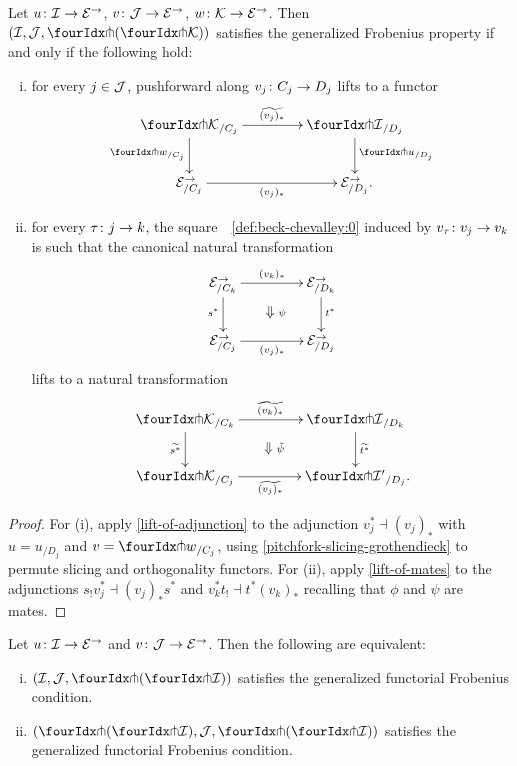 \documentclass[reqno,10pt,a4paper,oneside,draft]{amsart}
\begin{document}
{{\begin{proposition} \label{lift-pushforward}
Let $u \co \cal{I} \to \catE^\to$, $v \co \cal{J} \to \cal{E}^\to$, $w \co \cal{K} \to \catE^\to$.
Then $(\cal{I}, \cal{J}, \liftl{(\liftr{\cal{K}})})$ satisfies the generalized Frobenius property if and only if the following hold:
\begin{enumerate}[(i)]
\item for every $j \in \cal{J}$, pushforward along $v_j \co C_j \to D_j$ lifts to a functor
\[
\xymatrix@C=1.5cm{
  {\liftr{\cal{K}}}_{/C_j}
  \ar[r]^{\widetilde{(v_j)_*}}
  \ar[d]_{\liftr{w}_{/C_j}}
&
  {\liftr{\cal{I}}}_{/D_j}
  \ar[d]^{{\liftr{u}}_{/D_j}}
\\
  \catE_{/C_j}^\to
  \ar[r]_{(v_j)_*}
&
  \catE_{/D_j}^\to
\rlap{.}}
\]
\item for every $\tau \co j \to k$, the square~~\eqref{def:beck-chevalley:0} induced by $v_\tau \co v_j \to v_k$ is such that the canonical natural transformation
\[
\xymatrix@C+2em{
  \catE^\to_{/C_k}
  \ar[r]^{(v_k)_*}
  \ar[d]_{s^*}
  \ar@{}[dr]|{\textstyle\Downarrow \rlap{$\labelstyle\psi$}}
&
  \catE^\to_{/D_k}
  \ar[d]^{t^*}
\\
  \catE^\to_{/C_j}
  \ar[r]_{(v_j)_*}
&
  \catE^\to_{/D_j}
}
\]
lifts to a natural transformation
\[
\xymatrix@C+2em{
  {\liftr{\cal{K}}}_{/C_k}
  \ar[r]^{\widetilde{(v_k)_*}}
  \ar[d]_{\widetilde{s^*}}
  \ar@{}[dr]|{\textstyle\Downarrow \rlap{$\labelstyle\tilde{\psi}$}}
&
  {\liftr{\cal{I}}}_{/D_k}
  \ar[d]^{\widetilde{t^*}}
\\
  {\liftr{\cal{K}}}_{/C_j}
  \ar[r]_{\widetilde{(v_j)_*}}
&
  {\liftr{\cal{I}'}}_{/D_j}
\rlap{.}}
\]
\end{enumerate}
\end{proposition}

\begin{proof} 
For (i), apply \cref{lift-of-adjunction} to the adjunction $v_j^* \dashv (v_j)_*$ with $u = u_{/D_j}$ and $v = {\liftr{w}}_{/C_j}$, using \cref{pitchfork-slicing-grothendieck} to permute slicing and orthogonality functors.
For (ii), apply \cref{lift-of-mates} to the adjunctions $s_! v_j^* \dashv (v_j)_* s^*$ and $v_k^* t_! \dashv t^* (v_k)_*$ recalling that $\phi$ and $\psi$ are mates.
\end{proof}

\begin{proposition} \label{double-pitchfork-in-generalized-uniform-frob}
Let $u \co \cal{I} \to \catE^\to$ and $v \co \cal{J} \to \catE^\to$.
Then the following are equivalent:
\begin{enumerate}[(i)]
\item $(\cal{I}, \cal{J}, \liftl{(\liftr{\cal{I}})})$ satisfies the generalized functorial Frobenius condition.
\item $(\liftl{(\liftr{\cal{I}})}, \cal{J}, \liftl{(\liftr{\cal{I}})})$ satisfies the generalized functorial Frobenius condition.
\end{enumerate}
\end{proposition}

}}
\end{document}
